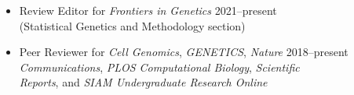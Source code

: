 \documentclass[margin]{res}
\begin{document}
\begin{resume}
\begin{itemize}
	\item Review Editor for \textit{Frontiers in Genetics}   \hfill 2021--present \\ (Statistical Genetics and Methodology section)
	\item Peer Reviewer for \textit{Cell Genomics}, \textit{GENETICS},  \textit{Nature }  \hfill 2018--present \\ \textit{Communications}, \textit{PLOS Computational Biology},  \textit{Scientific} \\ \textit{Reports},  and \textit{SIAM Undergraduate Research Online} 
	\end{itemize}
	

\end{resume}
\end{document}

